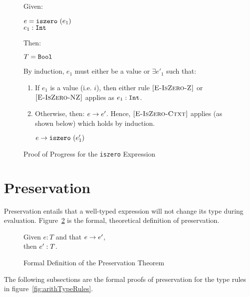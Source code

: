\documentclass{report}
\newcommand{\rel}[1]{\mbox{\sc [#1]}}
\begin{document}
\begin{figure}[ht!]
Given:
\begin{center}
  $e = \mbox{\tt iszero}~(e_1)$ \\
  ${e_1} : {\mbox{\tt Int}}$
\end{center}
Then:~\\
\begin{center}
   $T = \mbox{\tt Bool}$
\end{center}

By induction, $e_1$ must either be a value or $\exists e'_1$ such that:~\\

	\begin{enumerate}
    \item If $e_1$ is a value (i.e. $i$), then either rule $\rel{E-IsZero-Z}$ or $\rel{E-IsZero-NZ}$ applies as ${e_1} : {\mbox{\tt Int}}$.
      
    \item Otherwise, then: ${e} \rightarrow {e'}$.  Hence, $\rel{E-IsZero-Ctxt}$ applies (as shown below) which holds by induction.
    
    \begin{center}
      ${e} \rightarrow {\mbox{\tt iszero}~(e'_1)}$
    \end{center}
	
	\end{enumerate}
	
  \caption{Proof of Progress for the \texttt{iszero} Expression}\label{fig:isZeroProofProgress}
\end{figure}

\eject
\section{Preservation}\label{sec:preservation}

Preservation entails that a well-typed expression will not change its type during evaluation.  Figure~\ref{fig:preservationTheorem} is the formal, theoretical definition of preservation.

\begin{figure}[H]

	Given $e : T$ and that ${e} \rightarrow {e'}$,\\
	then ${e'} : {T}$.
	
  \caption{Formal Definition of the Preservation Theorem}\label{fig:preservationTheorem}
\end{figure}

The following subsections are the formal proofs of preservation for the type rules in figure~\ref{fig:arithTypeRules}. 
\end{document}
